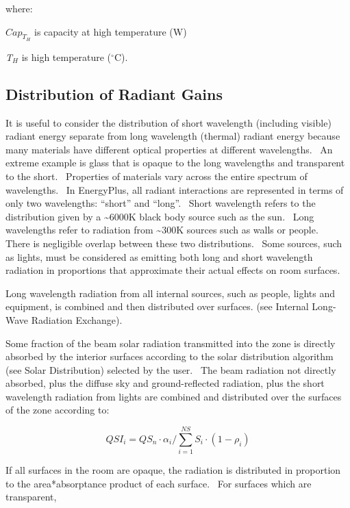 where:

\(Ca{p_{{T_H}}}\) is capacity at high temperature (W)

\emph{T\(_{H}\)} is high temperature (\(^{\circ}\)C).

\subsection{Distribution of Radiant Gains}\label{distribution-of-radiant-gains}

It is useful to consider the distribution of short wavelength (including visible) radiant energy separate from long wavelength (thermal) radiant energy because many materials have different optical properties at different wavelengths.~ An extreme example is glass that is opaque to the long wavelengths and transparent to the short.~ Properties of materials vary across the entire spectrum of wavelengths.~ In EnergyPlus, all radiant interactions are represented in terms of only two wavelengths: ``short'' and ``long''.~ Short wavelength refers to the distribution given by a \textasciitilde{}6000K black body source such as the sun.~ Long wavelengths refer to radiation from \textasciitilde{}300K sources such as walls or people.~ There is negligible overlap between these two distributions.~ Some sources, such as lights, must be considered as emitting both long and short wavelength radiation in proportions that approximate their actual effects on room surfaces.

Long wavelength radiation from all internal sources, such as people, lights and equipment, is combined and then distributed over surfaces. (see Internal Long-Wave Radiation Exchange).

Some fraction of the beam solar radiation transmitted into the zone is directly absorbed by the interior surfaces according to the solar distribution algorithm (see Solar Distribution) selected by the user.~ The beam radiation not directly absorbed, plus the diffuse sky and ground-reflected radiation, plus the short wavelength radiation from lights are combined and distributed over the surfaces of the zone according to:

\begin{equation}
QS{I_i} = Q{S_n}\cdot {\alpha_i}/\sum\limits_{i = 1}^{NS} {{S_i}\cdot (1 - {\rho_i})}
\end{equation}

If all surfaces in the room are opaque, the radiation is distributed in proportion to the area*absorptance product of each surface.~ For surfaces which are transparent,

